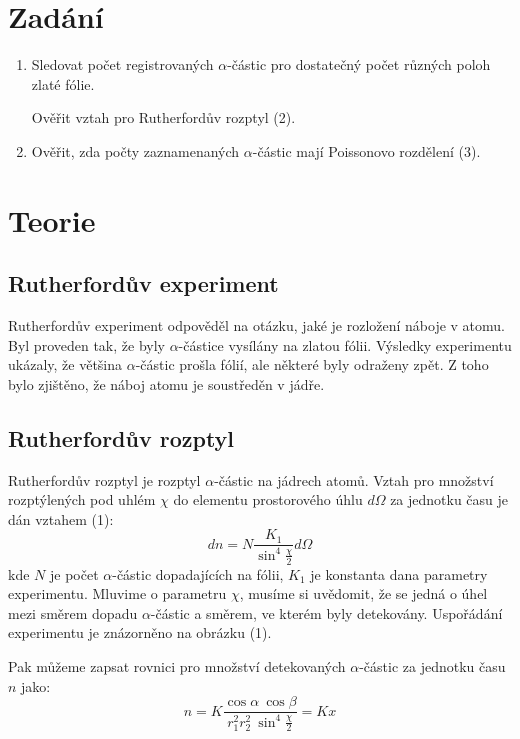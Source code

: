\documentclass[a4paper,11pt]{article}
\begin{document}
\vskip10pt
    \begin{minipage}[t]{0.5\textwidth} 
        \section{Zadání}    
            \begin{enumerate}
                \item Sledovat počet registrovaných $\alpha$-částic pro dostatečný počet různých poloh zlaté fólie.
                \par Ověřit vztah pro Rutherfordův rozptyl (2).
                \item Ověřit, zda počty zaznamenaných $\alpha$-částic mají Poissonovo rozdělení (3).
            \end{enumerate}
        \section{Teorie}
            \subsection{Rutherfordův experiment}
                Rutherfordův experiment odpověděl na otázku, jaké je rozložení náboje v atomu. Byl proveden tak, že byly $\alpha$-částice vysílány na zlatou fólii. Výsledky experimentu ukázaly, že většina $\alpha$-částic prošla fólií, ale některé byly odraženy zpět. Z toho bylo zjištěno, že náboj atomu je soustředěn v jádře.

            \subsection{Rutherfordův rozptyl}
                Rutherfordův rozptyl je rozptyl $\alpha$-částic na jádrech atomů. Vztah pro množství rozptýlených pod uhlém $\chi$ do elementu prostorového úhlu $d\Omega$ za jednotku času je dán vztahem (1):
                \begin{equation}
                    dn = N \frac{K_1}{\sin^4\frac{\chi}{2}} d\Omega
                \end{equation}
                kde $N$ je počet $\alpha$-částic dopadajících na fólii, $K_1$ je konstanta dana parametry experimentu.
                Mluvime o parametru $\chi$, musíme si uvědomit, že se jedná o úhel mezi směrem dopadu $\alpha$-částic a směrem, ve kterém byly detekovány. Uspořádání experimentu je znázorněno na obrázku (1).
                \par Pak můžeme zapsat rovnici pro množství detekovaných $\alpha$-částic za jednotku času $n$ jako:
                \begin{equation}
                    n = K \frac{\cos\alpha ~ \cos\beta}{r_1^2 r_2^2 ~ \sin^4\frac{\chi}{2}} = Kx
                \end{equation}
    \end{minipage}
\end{document}
